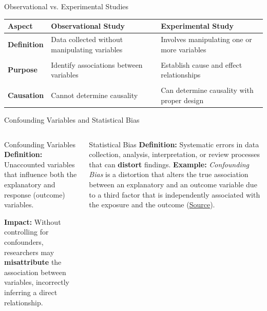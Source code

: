\documentclass[handout]{beamer} %
\begin{document}
\begin{frame}{Observational vs. Experimental Studies}
    \begin{tabular}{ l | p{} | p{} }
        \textbf{Aspect} & \textbf{Observational Study} & \textbf{Experimental Study} \\
        \hline
        \textbf{Definition} & Data collected without manipulating variables & Involves manipulating one or more variables \\ \pause  %
        & & \\
        \textbf{Purpose} & Identify associations between variables & Establish cause and effect relationships \\ \pause  %
                & & \\
        \textbf{Causation} & Cannot determine causality & Can determine causality with proper design \\
    \end{tabular}
\end{frame}

\begin{frame}{Confounding Variables and Statistical Bias}

    \begin{columns}[T] %
            \begin{block}{Confounding Variables}
                \textbf{Definition:} Unaccounted variables that influence both the explanatory and response (outcome) variables. \pause %

                \vspace{0.2cm}

                \textbf{Impact:} Without controlling for confounders, researchers may \textbf{misattribute} the association between variables, incorrectly inferring a direct relationship. \pause %
            \end{block}

            \begin{block}{Statistical Bias}
                \textbf{Definition:} Systematic errors in data collection, analysis, interpretation, or review processes that can \textbf{distort} findings.
                \pause %
                \vspace{0.2cm}
                \textbf{Example:} \textit{Confounding Bias} is a distortion that alters the true association between an explanatory and an outcome variable due to a third factor that is independently associated with the exposure and the outcome (\href{https://catalogofbias.org/biases/confounding/}{Source}).
            \end{block}
    \end{columns}

\end{frame}
\end{document}
